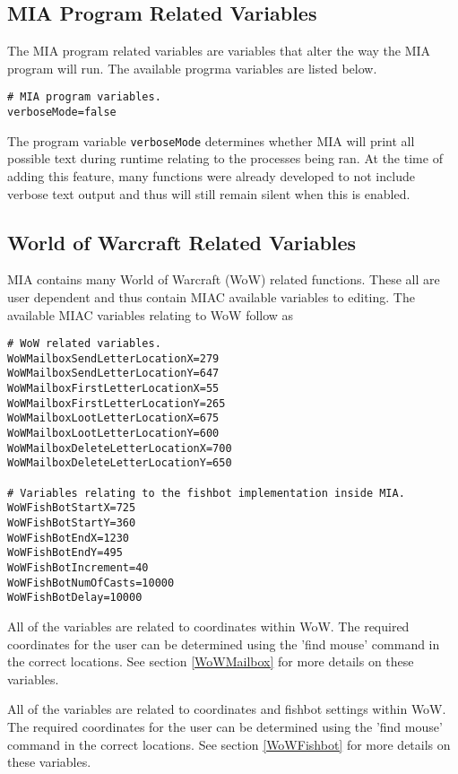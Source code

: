 \subsection{MIA Program Related Variables}

The MIA program related variables are variables that alter the way the MIA program will run. The available progrma variables are listed below.

\begin{lstlisting}
# MIA program variables.
verboseMode=false
\end{lstlisting}

The program variable \lstinline{verboseMode} determines whether MIA will print all possible text during runtime relating to the processes being ran. At the time of adding this feature, many functions were already developed to not include verbose text output and thus will still remain silent when this is enabled.

\subsection{World of Warcraft Related Variables}

MIA contains many World of Warcraft (WoW) related functions. These all are user dependent and thus contain MIAC available variables to editing. The available MIAC variables relating to WoW follow as

\begin{lstlisting}
# WoW related variables.
WoWMailboxSendLetterLocationX=279
WoWMailboxSendLetterLocationY=647
WoWMailboxFirstLetterLocationX=55
WoWMailboxFirstLetterLocationY=265
WoWMailboxLootLetterLocationX=675
WoWMailboxLootLetterLocationY=600
WoWMailboxDeleteLetterLocationX=700
WoWMailboxDeleteLetterLocationY=650

# Variables relating to the fishbot implementation inside MIA.
WoWFishBotStartX=725
WoWFishBotStartY=360
WoWFishBotEndX=1230
WoWFishBotEndY=495
WoWFishBotIncrement=40
WoWFishBotNumOfCasts=10000
WoWFishBotDelay=10000
\end{lstlisting}

All of the  variables are related to coordinates within WoW. The required coordinates for the user can be determined using the 'find mouse' command in the correct locations. See section \ref{WoWMailbox} for more details on these variables.

All of the  variables are related to coordinates and fishbot settings within WoW. The required coordinates for the user can be determined using the 'find mouse' command in the correct locations. See section \ref{WoWFishbot} for more details on these variables.




